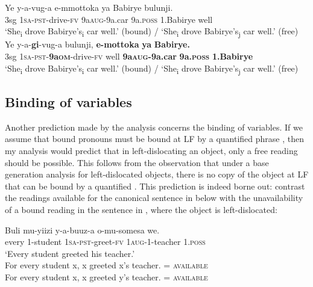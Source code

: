 \documentclass[output=paper
,newtxmath
,modfonts
,nonflat]{langsci/langscibook}
\begin{document}
\ea\label{ex:ranero:34}
\ea\label{ex:ranero:34a}
\gll Ye  y-a-vug-a             e-mmottoka   ya          Babirye   bulunji.\\
3sg \textsc{1sa-pst}{}-drive-\textsc{fv} 9a\textsc{aug}{}-9a.car 9a.\textsc{poss} 1.Babirye well\\
\glt *‘She\textsubscript{i} drove Babirye’s\textsubscript{i} car well.’ (bound) / ‘She\textsubscript{i} drove Babirye’s\textsubscript{j} car well.’ (free)
\ex\label{ex:ranero:34b}
\gll Ye  y-a-\textbf{gi}{}-vug-a          bulunji, \textbf{e-mottoka}       \textbf{ya}          \textbf{Babirye.}\\
3sg \textsc{1sa-pst}{}-\textbf{9a\textsc{om}}{}-drive-\textsc{fv} well       \textbf{9a\textsc{aug}}\textbf{{}-9a.car} \textbf{9a.}\textbf{\textsc{poss}} \textbf{1.Babirye}\\
\glt *‘She\textsubscript{i} drove Babirye’s\textsubscript{i} car well.’ (bound) / ‘She\textsubscript{i} drove Babirye’s\textsubscript{j} car well.’ (free)
\z
\z

\subsection{Binding of variables}\label{sec:ranero:5.2}

\textup{Another prediction made by the analysis concerns the binding of variables. If we assume that bound pronouns must be bound at LF by a quantified phrase \citep[see][]{Hornstein1990}, then my analysis would predict that in left-dislocating an object, only a free reading should be possible. This follows from the observation that under a base generation analysis for left-dislocated objects, there is no copy of the object at LF that can be bound by a quantified . This prediction is indeed borne out: contrast the readings available for the canonical sentence in  below with the unavailability of a bound reading in the sentence in , where the object is left-dislocated:}


\ea\label{ex:ranero:35}
\gll Buli   mu-yiizi   y-a-buuz-a     o-mu-somesa     we.\\
every 1-student  \textsc{1sa-pst}{}-greet-\textsc{fv} \textsc{1aug-}1-teacher 1.\textsc{poss}\\
\glt ‘Every student greeted his teacher.’\\ 
\-\hspace{1cm}For every student x, x greeted x’s teacher. = \textsc{available}\\
\-\hspace{1cm}For every student x, x greeted y’s teacher. = \textsc{available}
\z
\end{document}

